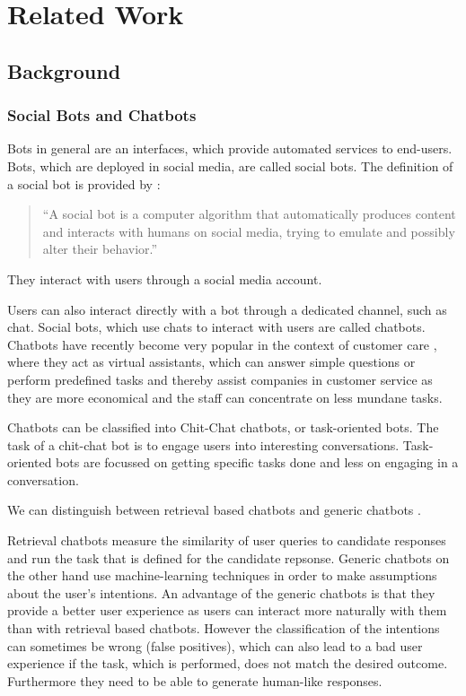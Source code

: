 \chapter{Related Work}

\section{Background}

\subsection{Social Bots and Chatbots}
Bots in general are an interfaces, which provide automated services to end-users. Bots, which are deployed in social media, are called social bots. The definition of a social bot is provided by \cite{FVD*16b}:
\begin{quote}
    ``A social bot is a computer algorithm that automatically produces content and interacts with humans on social media, trying to emulate and possibly alter their behavior.''
\end{quote}
They interact with users through a social media account.

Users can also interact directly with a bot through a dedicated channel, such as chat. Social bots, which use chats to interact with users are called chatbots. Chatbots have recently become very popular in the context of customer care \cite{CHW*17}, where they act as virtual assistants, which can answer simple questions or perform predefined tasks and thereby assist companies in customer service as they are more economical and the staff can concentrate on less mundane tasks.

Chatbots can be classified into Chit-Chat chatbots, or task-oriented bots. The task of a chit-chat bot is to engage users into interesting conversations. Task-oriented bots are focussed on getting specific tasks done and less on engaging in a conversation.

We can distinguish between retrieval based chatbots and generic chatbots \cite{NLKl19,WWX*16}.

Retrieval chatbots measure the similarity of user queries to candidate responses and run the task that is defined for the candidate repsonse. Generic chatbots on the other hand use machine-learning techniques in order to make assumptions about the user's intentions. An advantage of the generic chatbots is that they provide a better user experience as users can interact more naturally with them than with retrieval based chatbots. However the classification of the intentions can sometimes be wrong (false positives), which can also lead to a bad user experience if the task, which is performed, does not match the desired outcome. Furthermore they need to be able to generate human-like responses.

